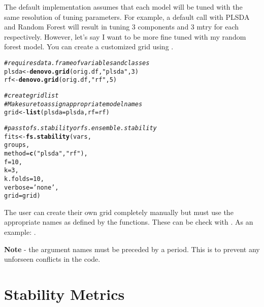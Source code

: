 \documentclass[12pt]{article}\usepackage[]{graphicx}\usepackage[usenames,dvipsnames]{color}
\makeatletter
\newcommand{\hlnum}[1]{\textcolor[rgb]{0.686,0.059,0.569}{#1}}%
\newcommand{\hlstr}[1]{\textcolor[rgb]{0.192,0.494,0.8}{#1}}%
\newcommand{\hlcom}[1]{\textcolor[rgb]{0.678,0.584,0.686}{\textit{#1}}}%
\newcommand{\hlstd}[1]{\textcolor[rgb]{0.345,0.345,0.345}{#1}}%
\newcommand{\hlkwb}[1]{\textcolor[rgb]{0.69,0.353,0.396}{#1}}%
\newcommand{\hlkwc}[1]{\textcolor[rgb]{0.333,0.667,0.333}{#1}}%
\newcommand{\hlkwd}[1]{\textcolor[rgb]{0.737,0.353,0.396}{\textbf{#1}}}%
\newenvironment{kframe}{%
 \def\at@end@of@kframe{}%
 \ifinner\ifhmode%
  \def\at@end@of@kframe{\end{minipage}}%
  \begin{minipage}{\columnwidth}%
 \fi\fi%
 \def\FrameCommand##1{\hskip\@totalleftmargin \hskip-\fboxsep
 \colorbox{shadecolor}{##1}\hskip-\fboxsep
     \hskip-\linewidth \hskip-\@totalleftmargin \hskip\columnwidth}%
 \MakeFramed {\advance\hsize-\width
   \@totalleftmargin\z@ \linewidth\hsize
   \@setminipage}}%
 {\par\unskip\endMakeFramed%
 \at@end@of@kframe}
\newenvironment{knitrout}{}{} %
\makeatother
\begin{document}
The default implementation assumes that each model will be tuned with the same
resolution of tuning parameters.  For example, a default call with PLSDA and 
Random Forest will result in tuning 3 components and 3 mtry for each
respectively.  However, let's say I want to be more fine tuned with my
random forest model.  You can create a customized grid using 
.

\begin{knitrout}
\color{fgcolor}\begin{kframe}
\begin{alltt}
\hlcom{# requires data.frame of variables and classes}
\hlstd{plsda} \hlkwb{<-} \hlkwd{denovo.grid}\hlstd{(orig.df,} \hlstr{"plsda"}\hlstd{,} \hlnum{3}\hlstd{)}
\hlstd{rf} \hlkwb{<-} \hlkwd{denovo.grid}\hlstd{(orig.df,} \hlstr{"rf"}\hlstd{,} \hlnum{5}\hlstd{)}

\hlcom{# create grid list}
\hlcom{# Make sure to assign appropriate model names}
\hlstd{grid} \hlkwb{<-} \hlkwd{list}\hlstd{(}\hlkwc{plsda}\hlstd{=plsda,} \hlkwc{rf}\hlstd{=rf)}

\hlcom{# pass to fs.stability or fs.ensemble.stability}
\hlstd{fits} \hlkwb{<-} \hlkwd{fs.stability}\hlstd{(vars,}
                    \hlstd{groups,}
                    \hlkwc{method} \hlstd{=} \hlkwd{c}\hlstd{(}\hlstr{"plsda"}\hlstd{,} \hlstr{"rf"}\hlstd{),}
                    \hlkwc{f} \hlstd{=} \hlnum{10}\hlstd{,}
                    \hlkwc{k} \hlstd{=} \hlnum{3}\hlstd{,}
                    \hlkwc{k.folds} \hlstd{=} \hlnum{10}\hlstd{,}
                    \hlkwc{verbose} \hlstd{=} \hlstr{'none'}\hlstd{,}
                    \hlkwc{grid} \hlstd{= grid)}
\end{alltt}
\end{kframe}
\end{knitrout}

The user can create their own grid completely manually but must use the 
appropriate names as defined by the functions.  These can be check with 
.  As an example: .  

\textbf{Note} - the argument names must be preceded by a period.  This is to
prevent any unforseen conflicts in the code.

\newpage
\maketitle
\section{Stability Metrics}
\end{document}
